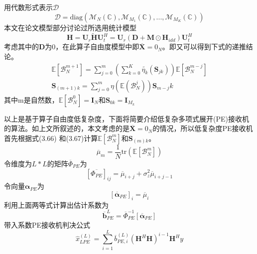 \documentclass[bachelor,nocolorlinks, printoneside]{seuthesis} %
\begin{document}
\begin{Main}
用代数形式表示$\mathcal{D}$
\begin{equation}\label{key}
\mathcal{D} = \mathrm{diag}(\mathcal{M}_N(\mathbb{C}),\mathcal{M}_{M_1}(\mathbb{C}),...,\mathcal{M}_{M_K}(\mathbb{C}))
\end{equation}
本文在论文模型部分讨论过所选用统计模型
\begin{equation}\label{key}
\mathbf{H} = \mathbf{U}_{r}\tilde{\mathbf{H}}\mathbf{U}_{t}^{H} = \mathbf{U}_{r}(\mathbf{D}+\mathbf{M}\odot \mathbf{H}_{idd})\mathbf{U}_{t}^{H}
\end{equation}
考虑其中的$\mathbf{D}$为0，在此算子自由度模型中即$\overline{\mathbf{X}} = 0_N$。即又可以得到下式的递推结论。
\begin{gather}\label{key}
\mathbb{E}[\mathcal{B}^{m+1}_N] = \sum_{j=0}^{m}(\sum_{k=0}^{K}\tilde{\eta_k}(\mathbf{S}_{jk}))\mathbb{E}[\mathcal{B}_N^{m-j}] \\
\mathbf{S}_{(m+1)k} =\sum_{j=0}^{m}\eta(\mathbb{E}(\mathcal{B}_N^j))\mathbf{S}_{m-j}k
\end{gather}
其中m是自然数，$\mathbb{E}[\mathcal{B}_N^0]=\mathbf{I}_N$和$\mathbf{S}_{0k}=\mathbf{I}_{M_k}$

以上是基于算子自由度低复杂度，下面将简要介绍低复杂多项式展开(PE)接收机的算法。如上文所叙述的，本文考虑的是$\overline{\mathbf{X}} = 0_N$的情况，所以低复杂度PE接收机首先根据式(3.66) 
和(3.67)计算$\mathbb{E}[\mathcal{B}_N^{m}]$和$\mathbf{S}_{(m)k}$。
\begin{equation}\label{key}
\overline{\mu}_{m} = \frac{1}{N} \mathrm{tr}(\mathbb{E}[\mathcal{B}_N^{m}])
\end{equation}
令维度为$L*L$的矩阵$\overline{\Phi}_{PE}$为
\begin{equation}\label{key}
[\overline{\Phi_{PE}}]_{ij} = \overline{\mu}_{i+j} + \sigma_z^2 \overline{\mu}_{i+j-1}
\end{equation}
令向量$\bm{\alpha}_{PE}$为
\begin{equation}\label{key}
[\overline{\bm{\alpha}}_{PE}]_i = \overline{\mu}_i
\end{equation}
利用上面两等式计算出估计系数为
\begin{equation}\label{key}
\overline{\mathbf{b}}_{PE}^{L} = \overline{\Phi}_{PE}^{-1} [\overline{\bm{\alpha}}_{PE}]
\end{equation}
带入系数PE接收机判决公式
\begin{equation}\label{key}
\hat{x}_{LPE}^{(L)} = \sum_{i=1}^{L}\overline{b}_{PE,i}^{(L)}(\mathbf{H}^H\mathbf{H})^{i-1}  \mathbf{H}^H y
\end{equation}


\end{Main}
\end{document}
